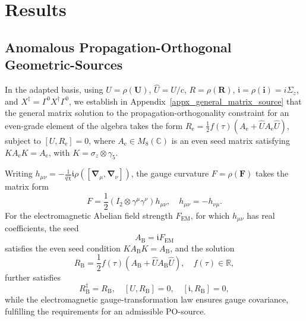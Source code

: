 
\section{Results}
\subsection{Anomalous Propagation-Orthogonal Geometric-Sources}
In the adapted basis, using $U=\rho(\mathbf{U})$, $\hat{U}=U/c$, $R=\rho(\mathbf{R})$, $\mathfrak{i}=\rho(\mathbf{i})=i\Sigma_{z}$, and $X^{\ddagger}=\Gamma^{0}X^{\dagger}\Gamma^{0}$, we establish in Appendix~\ref{appx_general_matrix_source} that the general matrix solution to the propagation-orthogonality constraint for an even-grade element of the algebra takes the form $R_{\mathrm{e}}=\frac{1}{2}f(\tau)\left(A_{\mathrm{e}}+\hat{U}A_{\mathrm{e}}\hat{U}\right)$, subject to $[U,R_{\mathrm{e}}]=0$, where $A_{\mathrm{e}}\in M_{8}(\mathbb{C})$ is an even seed matrix satisfying $KA_{\mathrm{e}}K=A_{\mathrm{e}}$, with $K=\sigma_z\otimes\gamma_5$.

Writing $h_{\mu\nu}=-\frac{1}{q\chi}\mathfrak{i}\rho([\boldsymbol{\nabla}_{\mu},\boldsymbol{\nabla}_{\nu}])$, the gauge curvature $F=\rho(\mathbf{F})$ takes the matrix form
\begin{equation}
    F=\frac{1}{2}\left(I_{2}\otimes\gamma^{\mu}\gamma^{\nu}\right)h_{\mu\nu},\quad h_{\mu\nu}=-h_{\nu\mu}.
\end{equation}
For the electromagnetic Abelian field strength $F_{\mathrm{EM}}$, for which $h_{\mu\nu}$ has real coefficients, the seed
\begin{equation}
    A_{\mathrm{B}}=\mathfrak{i}F_{\mathrm{EM}}
\end{equation}
satisfies the even seed condition $KA_{\mathrm{B}}K=A_{\mathrm{B}}$, and the solution
\begin{equation}
    R_{\mathrm{B}}=\frac{1}{2}f(\tau)\left(A_{\mathrm{B}}+\hat{U}A_{\mathrm{B}}\hat{U}\right),\quad f(\tau)\in\mathbb{R},
\end{equation}
further satisfies
\begin{equation}
    R_{\mathrm{B}}^{\ddagger}=R_{\mathrm{B}},\quad [U,R_{\mathrm{B}}]=0,\quad [\mathfrak{i},R_{\mathrm{B}}]=0,
\end{equation}
while the electromagnetic gauge-transformation law ensures gauge covariance, fulfilling the requirements for an admissible PO-source.

